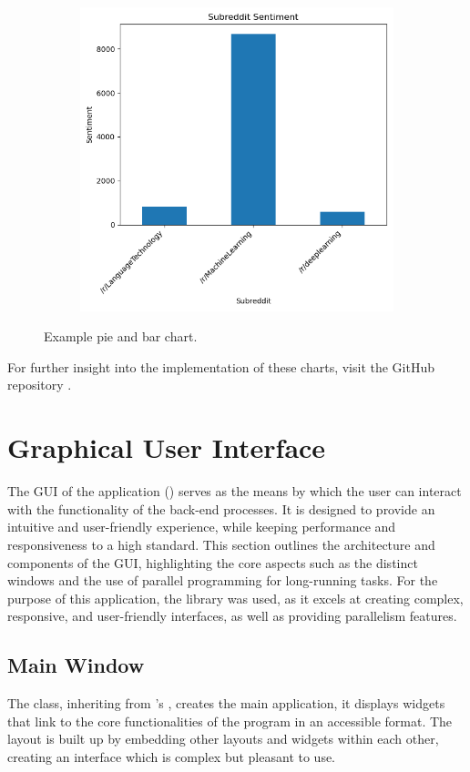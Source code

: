 \begin{figure}[h]
\begin{subfigure}{0.49\textwidth}
        \includegraphics[width=\textwidth]{figures/bar-chart.png}
    \end{subfigure}
    \caption{Example pie and bar chart.}
\end{figure}

For further insight into the implementation of these charts, visit the GitHub repository \citep{sentimentanalysistool}.

\section{Graphical User Interface}

The GUI of the application () serves as the means by which the user can interact with the functionality of the back-end processes. It is designed to provide an intuitive and user-friendly experience, while keeping performance and responsiveness to a high standard. This section outlines the architecture and components of the GUI, highlighting the core aspects such as the distinct windows and the use of parallel programming for long-running tasks. For the purpose of this application, the  library was used, as it excels at creating complex, responsive, and user-friendly interfaces, as well as providing parallelism features.

    \subsection{Main Window}
    The  class, inheriting from 's , creates the main application, it displays widgets that link to the core functionalities of the program in an accessible format. The layout is built up by embedding other layouts and widgets within each other, creating an interface which is complex but pleasant to use. 

